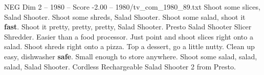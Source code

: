 \begin{textsample}{NEG Dim 2 – 1980 – Score -2.00 – 1980/tv\_com\_1980\_89.txt}  \label{ex:f2_neg_021}
Shoot some slices, Salad Shooter.
Shoot some shreds, Salad Shooter.
Shoot some salad, shoot it \textbf{fast}.
Shoot it pretty, pretty, pretty, Salad Shooter.
Presto Salad Shooter Slicer Shredder.
Easier than a food processor.
Just point and shoot slices right onto a salad.
Shoot shreds right onto a pizza.
Top a dessert, go a little nutty.
Clean up easy, dishwasher \textbf{safe}.
Small enough to store anywhere.
Shoot some salad, salad, salad, Salad Shooter.
Cordless Rechargeable Salad Shooter 2 from Presto.

\end{textsample}
